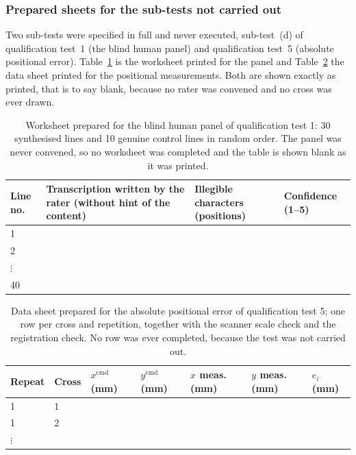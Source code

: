 \subsubsection{Prepared sheets for the sub-tests not carried out}

Two sub-tests were specified in full and never executed, sub-test~(d) of qualification test~1 (the blind human panel) and qualification test~5 (absolute positional error).
Table~\ref{tab:res-panel} is the worksheet printed for the panel and Table~\ref{tab:res-sheet} the data sheet printed for the positional measurements.
Both are shown exactly as printed, that is to say blank, because no rater was convened and no cross was ever drawn.

\begin{table}[h]
\centering
\fontsize{10}{12}\selectfont
\begin{tabularx}{\linewidth}{|l|X|l|l|}
\hline
\textbf{Line no.} & \textbf{Transcription written by the rater (without hint of the content)} & \textbf{Illegible characters (positions)} & \textbf{Confidence (1--5)} \\
\hline
1 & & & \\
\hline
2 & & & \\
\hline
$\vdots$ & & & \\
\hline
40 & & & \\
\hline
\end{tabularx}
\caption{Worksheet prepared for the blind human panel of qualification test 1: 30 synthesised lines and 10 genuine control lines in random order. The panel was never convened, so no worksheet was completed and the table is shown blank as it was printed.}
\label{tab:res-panel}
\end{table}

\begin{table}[h]
\centering
\fontsize{10}{12}\selectfont
\begin{tabularx}{\linewidth}{|l|l|l|l|l|l|X|}
\hline
\textbf{Repeat} & \textbf{Cross} & \textbf{$x^{\mathrm{cmd}}$ (mm)} & \textbf{$y^{\mathrm{cmd}}$ (mm)} & \textbf{$x$ meas. (mm)} & \textbf{$y$ meas. (mm)} & \textbf{$e_i$ (mm)} \\
\hline
1 & 1 & & & & & \\
\hline
1 & 2 & & & & & \\
\hline
$\vdots$ & & & & & & \\
\hline
\end{tabularx}
\caption{Data sheet prepared for the absolute positional error of qualification test 5; one row per cross and repetition, together with the scanner scale check and the registration check. No row was ever completed, because the test was not carried out.}
\label{tab:res-sheet}
\end{table}

